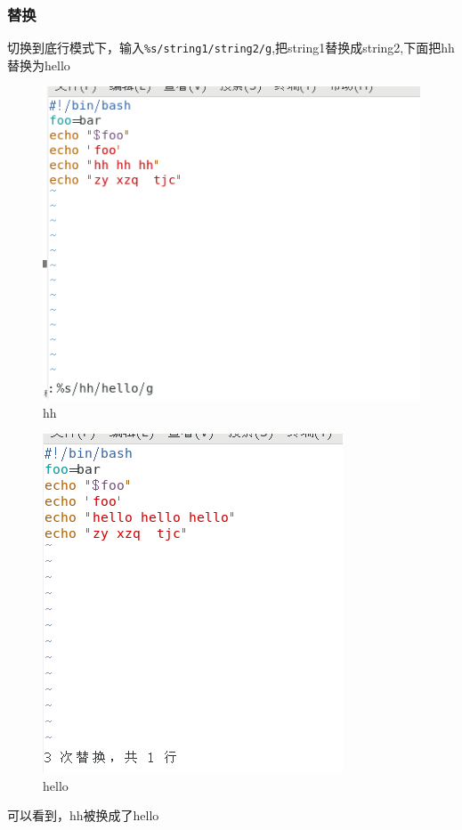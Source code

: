 \documentclass{ctexart}
\begin{document}
	\subsubsection{替换}
	切换到底行模式下，输入\verb|%s/string1/string2/g|,把string1替换成string2,下面把hh替换为hello
	\begin{figure}[H]
		\centering
		\includegraphics[scale=0.5]{2.41}
		\caption{hh}
	\end{figure}
	\begin{figure}[H]
		\centering
		\includegraphics[scale=0.5]{2.42}
		\caption{hello}
	\end{figure}
	
	可以看到，hh被换成了hello
	
\end{document}
